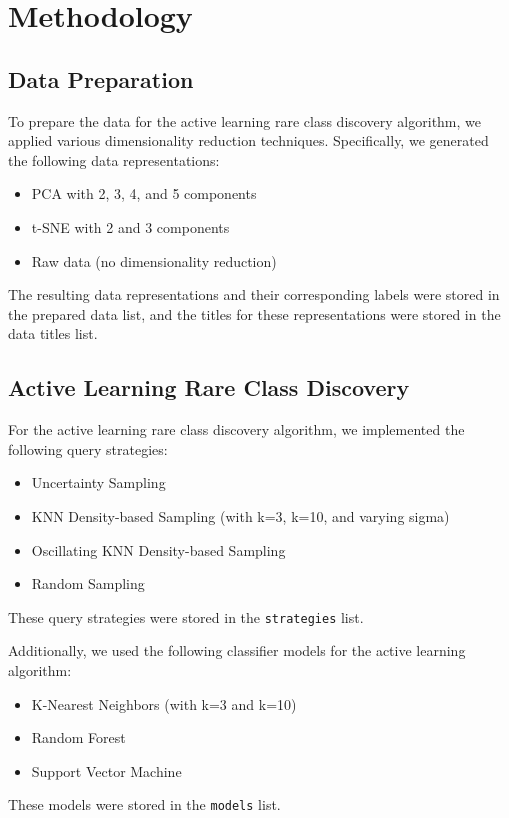 \section{Methodology}

\subsection{Data Preparation}
To prepare the data for the active learning rare class discovery algorithm, we applied various dimensionality reduction techniques. Specifically, we generated the following data representations:
\begin{itemize}
    \item PCA with 2, 3, 4, and 5 components
    \item t-SNE with 2 and 3 components
    \item Raw data (no dimensionality reduction)
\end{itemize}

The resulting data representations and their corresponding labels were stored in the prepared data list, and the titles for these representations were stored in the data titles list.

\subsection{Active Learning Rare Class Discovery}
For the active learning rare class discovery algorithm, we implemented the following query strategies:
\begin{itemize}
    \item Uncertainty Sampling
    \item KNN Density-based Sampling (with k=3, k=10, and varying sigma)
    \item Oscillating KNN Density-based Sampling
    \item Random Sampling
\end{itemize}
These query strategies were stored in the \texttt{strategies} list.

Additionally, we used the following classifier models for the active learning algorithm:
\begin{itemize}
    \item K-Nearest Neighbors (with k=3 and k=10)
    \item Random Forest
    \item Support Vector Machine
\end{itemize}
These models were stored in the \texttt{models} list.

